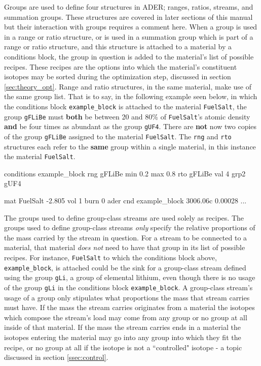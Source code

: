 Groups are used to define four structures in ADER; ranges, ratios, streams, and
summation groups. These structures are covered in later sections of this manual
but their interaction with groups requires a comment here. When a group is
used in a range or ratio structure, or is used in a summation group which is
part of a range or ratio structure, and this structure is attached to a material
by a conditions block, the group in question is added to the material's list
of possible recipes. These recipes are the options into which the material's
constituent isotopes may be sorted during the optimization step, discussed
in section \ref{sec:theory_opt}. Range and ratio structures, in the same
material, make use of the same group list. That is to say, in the following
example seen below, in which the conditions block \texttt{example\_block} is
attached to the material \texttt{FuelSalt}, 
the group \texttt{gFLiBe} must \textbf{both} be 
between 20 and 80\% of \texttt{FuelSalt}'s atomic density \textbf{and} be 
four times
as abundant as the group \texttt{gUF4}. There are \textbf{not} now two copies of
the group \texttt{gFLiBe} assigned to the material \texttt{FuelSalt}.
The \texttt{rng} and \texttt{rto} structures each refer to the \textbf{same} 
group  within a single material, 
in this instance the material \texttt{FuelSalt}.

\begin{li}
conditions example_block
rng gFLiBe min 0.2 max 0.8
rto gFLiBe val 4 grp2 gUF4

mat FuelSalt -2.805 vol 1 burn 0 ader cnd example_block
3006.06c    0.00028
...
\end{li}

The groups used to define group-class streams are used solely as recipes. 
The groups used to define group-class streams \textit{only} specify the
relative proportions of the mass carried by the stream in question. For a
stream to be connected to a material, that material \textit{does not} need to
have that group in its list of possible recipes. For instance, 
\texttt{FuelSalt}
to which the conditions block above, \texttt{example\_block}, is attached could
be the sink for a group-class stream defined using the group \texttt{gLi}, a 
group of elemental lithium, even though there is no usage of the group
\texttt{gLi} in the conditions block \texttt{example\_block}. A group-class
stream's usage of a group only stipulates what proportions the mass that
stream carries must have. If the mass the stream carries originates from a 
material the isotopes which compose the stream's load may come from any group
or no group at all inside of that material. If the mass the stream carries
ends in a material the isotopes entering the material may go into any group into
which they fit the recipe, or no group at all if the isotope is not a
``controlled" isotope - a topic discussed in section \ref{ssec:control}.

